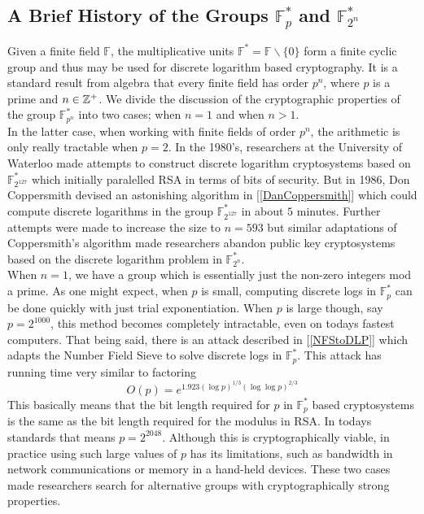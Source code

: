 \subsection{A Brief History of the Groups $\mathbb{F}_p^*$ and $\mathbb{F}_{2^n}^*$}

Given a finite field $\mathbb{F}$, the multiplicative units $\mathbb{F}^* = \mathbb{F} \backslash \lbrace 0 \rbrace $ form a finite cyclic group and thus may be used for discrete logarithm based cryptography. It is a standard result from algebra that every finite field has order $p^n$, where $p$ is a prime and $n \in \mathbb{Z}^+$. We divide the discussion of the cryptographic properties of the group $\mathbb{F}_{p^n}^*$ into two cases; when $n = 1$ and when $n>1$. \\

In the latter case, when working with finite fields of order $p^n$, the arithmetic is only really tractable when $p=2$. In the 1980's, researchers at the University of Waterloo made attempts to construct discrete logarithm cryptosystems based on $\mathbb{F}_{2^{127}}^*$ which initially paralelled RSA in terms of bits of security. But in 1986, Don Coppersmith devised an astonishing algorithm in [\ref{DanCoppersmith}] which could compute discrete logarithms in the group $\mathbb{F}_{2^{127}}^*$ in about $5$ minutes. Further attempts were made to increase the size to $n=593$ but similar adaptations of Coppersmith's algorithm made researchers abandon public key cryptosystems based on the discrete logarithm problem in $\mathbb{F}_{2^n}^*$. \\

When $n = 1$, we have a group which is essentially just the non-zero integers mod a prime. As one might expect, when $p$ is small, computing discrete logs in $\mathbb{F}_p^*$ can be done quickly with just trial exponentiation. When $p$ is large though, say $p = 2^{1000}$, this method becomes completely intractable, even on todays fastest computers. That being said, there is an attack described in [\ref{NFStoDLP}] which adapts the Number Field Sieve to solve discrete logs in $\mathbb{F}_p^*$. This attack has running time very similar to factoring $$O(p) = e^{1.923(\log p)^{1/3}(\log\log p)^{2/3}}$$ This basically means that the bit length required for $p$ in $\mathbb{F}_p^*$ based cryptosystems is the same as the bit length required for the modulus in RSA. In todays standards that means $p = 2^{2048}$. Although this is cryptographically viable, in practice using such large values of $p$ has its limitations, such as bandwidth in network communications or memory in a hand-held devices. These two cases made researchers search for alternative groups with cryptographically strong properties. 








